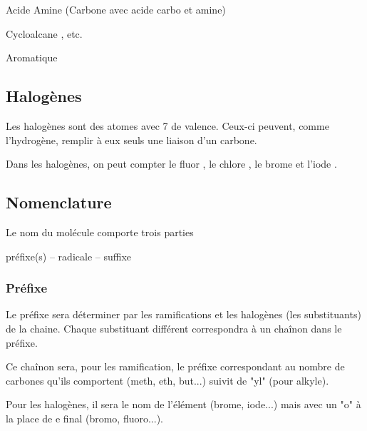 \documentclass[a4paper]{article}
\begin{document}
    Acide Amine \hspace{0.1\linewidth} \hspace{2em}(Carbone avec acide carbo et amine)\newline

    Cycloalcane \hspace{0.1\linewidth}, \hspace{2em}  \hspace{2em} etc.

    Aromatique \hspace{0.1\linewidth} \newline
    \subsection{Halogènes}
    Les halogènes sont des atomes avec 7 de valence. Ceux-ci peuvent, comme
    l'hydrogène, remplir à eux seuls une liaison d'un carbone.

    Dans les halogènes, on peut compter le fluor , le chlore , le
    brome  et l'iode .

    \subsection{Nomenclature}

    Le nom du molécule comporte trois parties \newline

    \centerline{préfixe(s) -- radicale -- suffixe}

    \subsubsection{Préfixe}
    Le préfixe sera déterminer par les ramifications et les halogènes (les
    substituants) de la chaine. Chaque substituant différent correspondra à un
    chaînon dans le préfixe. 

    Ce chaînon sera, pour les ramification, le préfixe correspondant au nombre
    de carbones qu'ils comportent (meth, eth, but...) suivit de "yl" (pour 
    alkyle). 

    Pour les halogènes, il sera le nom de l'élément (brome, iode...) mais
    avec un "o" à la place de e final (bromo, fluoro...).
\end{document}
